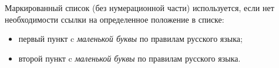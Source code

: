 Маркированный список (без нумерационной части) используется, если нет необходимости ссылки на определенное положение в списке:
\begin{itemize}
	\item первый пункт c {\itshape маленькой буквы} по правилам русского языка;
	\item второй пункт c {\itshape маленькой буквы} по правилам русского языка.
\end{itemize}
